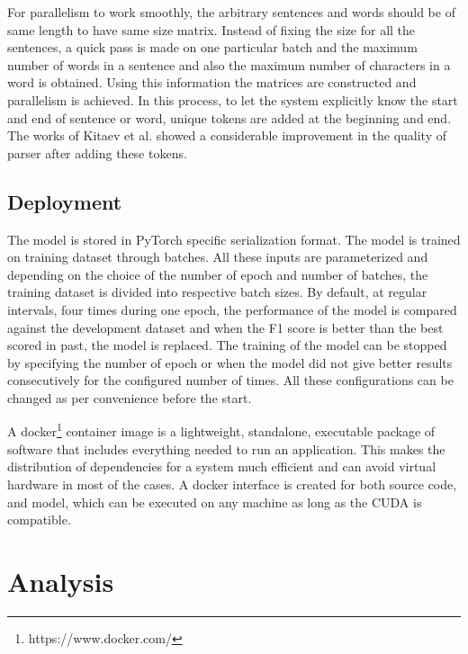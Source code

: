 \documentclass[a4paper, 11pt]{article}
\begin{document}
For parallelism to work smoothly, the arbitrary sentences and words should be of same length to have same size matrix. Instead of fixing the size for all the sentences, a quick pass is made on one particular batch and the maximum number of words in a sentence and also the maximum number of characters in a word is obtained. Using this information the matrices are constructed and parallelism is achieved. In this process, to let the system explicitly know the start and end of sentence or word, unique tokens are added at the beginning and end. The works of  Kitaev et al. \parencite*{Kitaev2019} showed a considerable improvement in the quality of parser after adding these tokens.

\subsection{Deployment}

The model is stored in PyTorch specific serialization format. The model is trained on training dataset through batches. All these inputs are parameterized and depending on the choice of the number of epoch and number of batches, the training dataset is divided into respective batch sizes. By default, at regular intervals, four times during one epoch, the performance of the model is compared against the development dataset and when the F1 score is better than the best scored in past, the model is replaced. The training of the model can be stopped by specifying the number of epoch or when the model did not give better results consecutively for the configured number of times. All these configurations can be changed as per convenience before the start. 

A docker\footnote{https://www.docker.com/} container image is a lightweight, standalone, executable package of software that includes everything needed to run an application. This makes the distribution of dependencies for a system much efficient and can avoid virtual hardware in most of the cases. A docker interface is created for both source code, and model, which can be executed on any machine as long as the CUDA is compatible. 




\pagebreak
\section{Analysis}
\end{document}
